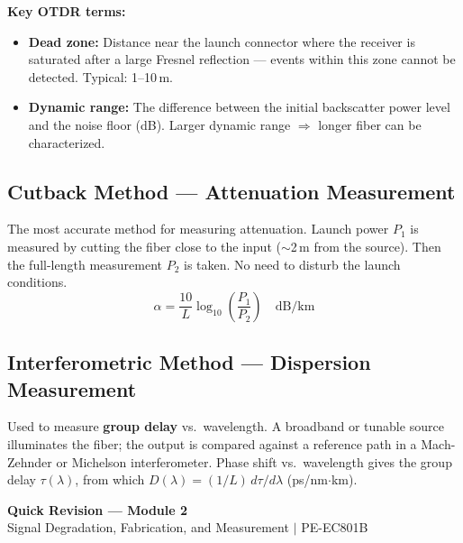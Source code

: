 \documentclass[12pt,a4paper]{article}
\begin{document}
\textbf{Key OTDR terms:}
\begin{itemize}[leftmargin=*, itemsep=2pt]
  \item \textbf{Dead zone:} Distance near the launch connector where the receiver is saturated after a large Fresnel reflection --- events within this zone cannot be detected. Typical: 1--10\,m.
  \item \textbf{Dynamic range:} The difference between the initial backscatter power level and the noise floor (dB). Larger dynamic range $\Rightarrow$ longer fiber can be characterized.
\end{itemize}

\subsection{Cutback Method --- Attenuation Measurement}
The most accurate method for measuring attenuation. Launch power $P_1$ is measured by cutting the fiber close to the input ($\sim$2\,m from the source). Then the full-length measurement $P_2$ is taken. No need to disturb the launch conditions.
\[
\alpha = \frac{10}{L}\log_{10}\!\left(\frac{P_1}{P_2}\right) \quad\text{dB/km}
\]

\subsection{Interferometric Method --- Dispersion Measurement}
Used to measure \textbf{group delay} vs.\ wavelength. A broadband or tunable source illuminates the fiber; the output is compared against a reference path in a Mach-Zehnder or Michelson interferometer. Phase shift vs.\ wavelength gives the group delay $\tau(\lambda)$, from which $D(\lambda) = (1/L)\,d\tau/d\lambda$ (ps/nm$\cdot$km).

\newpage
\begin{center}
  {\large\bfseries\color{myred} Quick Revision --- Module 2}\\[3pt]
  {\small\color{mydark} Signal Degradation, Fabrication, and Measurement $|$ PE-EC801B}
\end{center}
\noindent{\color{myred}\rule{\linewidth}{1.2pt}}
\vspace{4pt}
\end{document}
